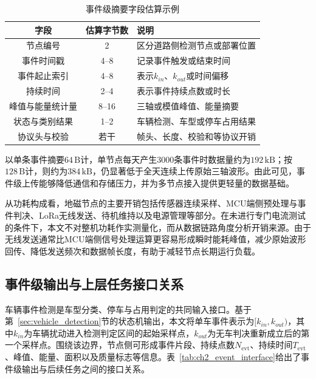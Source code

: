 \documentclass{xdupgthesis}
\begin{document}
\begin{table}[!htbp]
    \centering
    \caption{事件级摘要字段估算示例}
    \label{tab:ch2_event_packet}
    \begin{tabular}{c c C{6.2cm}}
        \toprule
        字段 & 估算字节数 & 说明 \\
        \midrule
        节点编号 & 2 & 区分道路侧检测节点或部署位置 \\
        事件时间戳 & 4--8 & 记录事件触发或结束时间 \\
        事件起止索引 & 4--8 & 表示$k_{in}$、$k_{out}$或时间偏移 \\
        持续时间 & 2--4 & 表示事件持续点数或时长 \\
        峰值与能量统计量 & 8--16 & 三轴或模值峰值、能量摘要 \\
        状态与类别结果 & 1--2 & 车辆检测、车型或停车占用结果 \\
        协议头与校验 & 若干 & 帧头、长度、校验和等协议开销 \\
        \bottomrule
    \end{tabular}
\end{table}

以单条事件摘要$64\,\mathrm{B}$计，单节点每天产生$3000$条事件时数据量约为$192\,\mathrm{kB}$；按$128\,\mathrm{B}$计，则约为$384\,\mathrm{kB}$，仍显著低于全天连续上传原始三轴波形。由此可见，事件级上传能够降低通信和存储压力，并为多节点接入提供更轻量的数据基础。

从功耗构成看，地磁节点的主要开销包括传感器连续采样、MCU端侧预处理与事件判决、LoRa无线发送、待机维持以及电源管理等部分。在未进行专门电流测试的条件下，本文不对整机功耗作实测量化，而从数据链路角度分析开销来源。由于无线发送通常比MCU端侧信号处理运算更容易形成瞬时能耗峰值，减少原始波形回传、降低发送频次和数据帧长度，有助于减轻节点长期运行负载。

\subsection{事件级输出与上层任务接口关系}
\label{sec:ch2_event_interface}

车辆事件检测是车型分类、停车与占用判定的共同输入接口。基于第~\ref{sec:vehicle_detection}节的状态机输出，本文将单车事件表示为$[k_{in},k_{out})$，其中$k_{in}$为车辆扰动进入检测判定区间的起始采样点，$k_{out}$为无车判决重新成立后的第一个采样点。围绕该边界，节点侧可形成事件片段、持续点数$N_{\mathrm{evt}}$、持续时间$T_{\mathrm{evt}}$、峰值、能量、面积以及质量标志等信息。表~\ref{tab:ch2_event_interface}给出了事件级输出与后续任务之间的接口关系。
\end{document}

